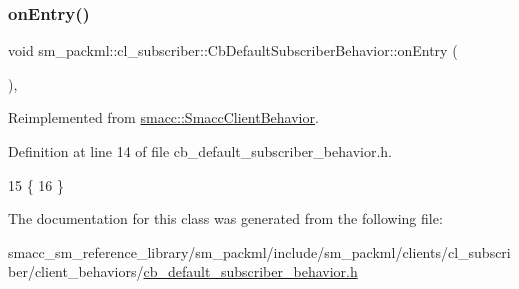 \subsubsection{\texorpdfstring{on\+Entry()}{onEntry()}}
{\footnotesize\ttfamily void sm\+\_\+packml\+::cl\+\_\+subscriber\+::\+Cb\+Default\+Subscriber\+Behavior\+::on\+Entry (\begin{DoxyParamCaption}{ }\end{DoxyParamCaption})\hspace{0.3cm}{\ttfamily [inline]}, {\ttfamily [virtual]}}



Reimplemented from \hyperlink{classsmacc_1_1SmaccClientBehavior_a7962382f93987c720ad432fef55b123f}{smacc\+::\+Smacc\+Client\+Behavior}.



Definition at line 14 of file cb\+\_\+default\+\_\+subscriber\+\_\+behavior.\+h.


\begin{DoxyCode}
15     \{
16     \}
\end{DoxyCode}


The documentation for this class was generated from the following file\+:\begin{DoxyCompactItemize}
\item 
smacc\+\_\+sm\+\_\+reference\+\_\+library/sm\+\_\+packml/include/sm\+\_\+packml/clients/cl\+\_\+subscriber/client\+\_\+behaviors/\hyperlink{sm__packml_2include_2sm__packml_2clients_2cl__subscriber_2client__behaviors_2cb__default__subscriber__behavior_8h}{cb\+\_\+default\+\_\+subscriber\+\_\+behavior.\+h}\end{DoxyCompactItemize}
